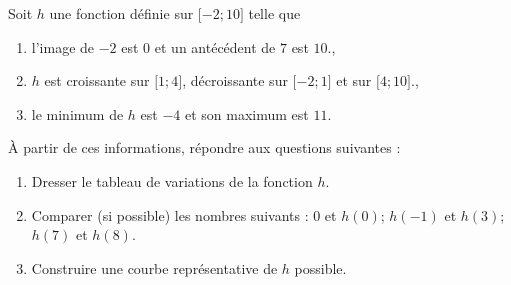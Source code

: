 
\begin{exercice}\label{exosmath-0550}

    Soit \( h\) une fonction définie sur \( \mathopen[ -2 ; 10 \mathclose]\) telle que 
    \begin{enumerate}
        \item
            l'image de \( -2\) est \( 0\) et un antécédent de \( 7\) est \( 10\).,
        \item
            \( h\) est croissante sur \( \mathopen[ 1 ; 4 \mathclose]\), décroissante sur \( \mathopen[ -2 ; 1 \mathclose]\) et sur \( \mathopen[ 4 ; 10 \mathclose]\).,
        \item
            le minimum de \( h\) est \( -4\) et son maximum est \( 11\).
    \end{enumerate}
    À partir de  ces informations, répondre aux questions suivantes :
    \begin{enumerate}
        \item
            Dresser le tableau de variations de la fonction \( h\).
        \item
            Comparer (si possible) les nombres suivants : \( 0\) et \( h(0)\); \( h(-1)\) et \( h(3)\); \( h(7)\) et \( h(8)\).
        \item
            Construire une courbe représentative de \( h\) possible.
    \end{enumerate}

\end{exercice}
